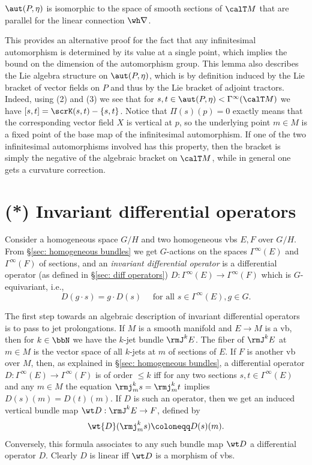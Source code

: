 \begin{cor}
    $\aut(P,\eta)$ is isomorphic to the space of smooth sections of $\calT M$ that are parallel for the linear connection $\wh\nabla$.
\end{cor}

This provides an alternative proof for the fact that any infinitesimal automorphism is determined by its value at a single point, which implies the bound on the dimension of the automorphism group. This lemma also describes the Lie algebra structure on $\aut(P,\eta)$, which is by definition induced by the Lie bracket of vector fields on $P$ and thus by the Lie bracket of adjoint tractors. Indeed, using (2) and (3) we see that for $s,t\in\aut(P,\eta)<\Gamma^\infty(\calT M)$ we have $[s,t]=\scrK(s,t)-\{s,t\}$. Notice that $\varPi(s)(p)=0$ exactly means that the corresponding vector field $X$ is vertical at $p$, so the underlying point $m\in M$ is a fixed point of the base map of the infinitesimal automorphism. If one of the two infinitesimal automorphisms involved has this property, then the bracket is simply the negative of the algebraic bracket on $\calT M$, while in general one gets a curvature correction.






\section{(*) Invariant differential operators}

Consider a homogeneous space $G\slash H$ and two homogeneous \glspl{vb} $E,F$ over $G\slash H$. From \S\ref{sec: homogeneous bundles} we get $G$-actions on the spaces $\Gamma^\infty(E)$ and $\Gamma^\infty(F)$ of sections, and an \emph{invariant differential operator} is a differential operator (as defined in \S\ref{sec: diff operators}) $D:\Gamma^\infty(E)\to \Gamma^\infty(F)$ which is $G$-equivariant, i.e., 
\[D(g\cdot s)=g\cdot D(s)\quad \text{ for all }s\in\Gamma^\infty(E),g\in G.\]

The first step towards an algebraic description of invariant differential operators is to pass to jet prolongations. If $M$ is a smooth manifold and $E\to M$ is a \gls{vb}, then for $k\in \bbN$ we have the $k$-jet bundle $\rmJ^k E$. The fiber of $\rmJ^k E$ at $m\in M$ is the vector space of all $k$-jets at $m$ of sections of $E$. If $F$ is another \gls{vb} over $M$, then, as explained in \S\ref{sec: homogeneous bundles}, a differential operator $D:\Gamma^\infty(E)\to \Gamma^\infty(F)$ is of order $\leq k$ iff for any two sections $s,t\in \Gamma^\infty(E)$ and any $m\in M$ the equation $\rmj^k_m s=\rmj^k_m t$ implies $D(s)(m)=D(t)(m)$. If $D$ is such an operator, then we get an induced vertical bundle map $\wt D:\rmJ^k E\to F$, defined by 
\[\wt{D}(\rmj^k_m s)\coloneqq D(s)(m).\]
Conversely, this formula associates to any such bundle map $\wt D$ a differential operator $D$. Clearly $D$ is linear iff $\wt D$ is a morphism of \glspl{vb}.


